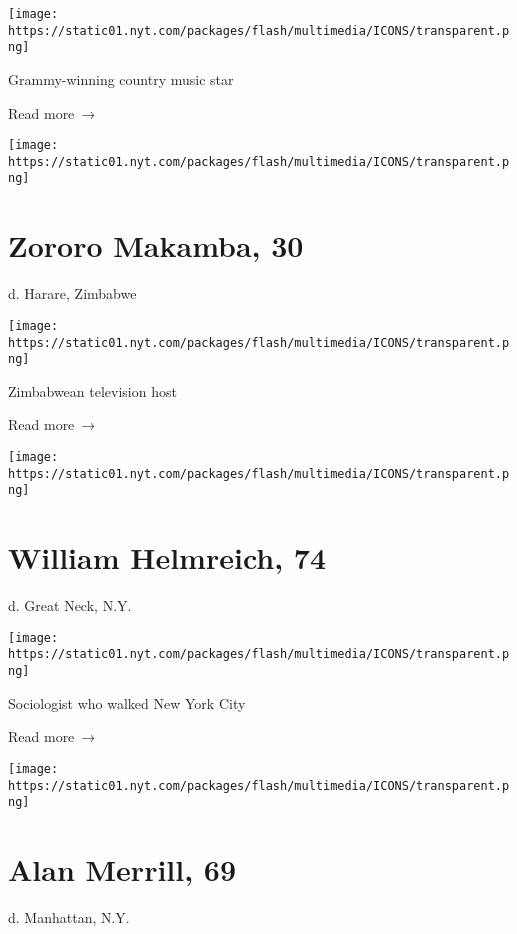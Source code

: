 \texttt{[image: https://static01.nyt.com/packages/flash/multimedia/ICONS/transparent.png]}

Grammy-winning country music star

 Read more~→

\href{https://www.nytimes.com/2020/03/30/obituaries/zororo-makamba-30-dies-zimbabwean-television-host.html}{}

\texttt{[image: https://static01.nyt.com/packages/flash/multimedia/ICONS/transparent.png]}

\hypertarget{zororo-makamba-30}{%
\section{Zororo Makamba, 30}\label{zororo-makamba-30}}

d. Harare, Zimbabwe

\texttt{[image: https://static01.nyt.com/packages/flash/multimedia/ICONS/transparent.png]}

Zimbabwean television host

 Read more~→

\href{https://www.nytimes.com/2020/03/30/nyregion/william-helmreich-dead-coronavirus.html}{}

\texttt{[image: https://static01.nyt.com/packages/flash/multimedia/ICONS/transparent.png]}

\hypertarget{william-helmreich-74}{%
\section{William Helmreich, 74}\label{william-helmreich-74}}

d. Great Neck, N.Y.

\texttt{[image: https://static01.nyt.com/packages/flash/multimedia/ICONS/transparent.png]}

Sociologist who walked New York City

 Read more~→

\href{https://www.nytimes.com/2020/03/30/arts/music/alan-merrill-dead-coronavirus.html}{}

\texttt{[image: https://static01.nyt.com/packages/flash/multimedia/ICONS/transparent.png]}

\hypertarget{alan-merrill-69}{%
\section{Alan Merrill, 69}\label{alan-merrill-69}}

d. Manhattan, N.Y.

